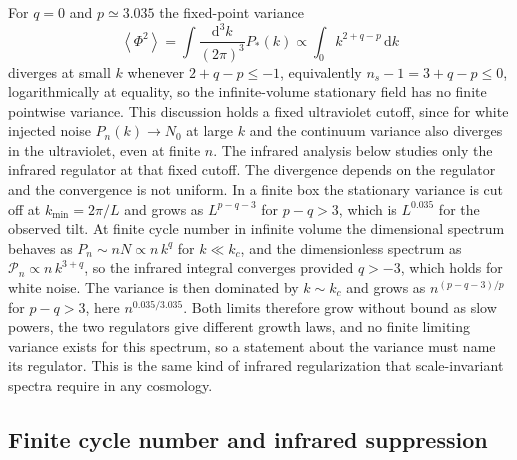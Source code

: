 \documentclass[11pt]{article}
\theoremstyle{definition}
\theoremstyle{remark}
\newcommand{\dd}{\mathrm{d}}
\newcommand{\avg}[1]{\left\langle #1 \right\rangle}
\newcommand{\Pk}{\mathcal{P}}
\begin{document}
For $q=0$ and $p\simeq3.035$ the fixed-point variance
\begin{equation}
\avg{\Phi^2}=\int\frac{\dd^3k}{(2\pi)^3}P_*(k)\propto\int_0k^{2+q-p}\,\dd k
\end{equation}
diverges at small $k$ whenever $2+q-p\le-1$, equivalently $n_s-1=3+q-p\le0$, logarithmically at equality, so the infinite-volume stationary field has no finite pointwise variance. This discussion holds a fixed ultraviolet cutoff, since for white injected noise $P_n(k)\to N_0$ at large $k$ and the continuum variance also diverges in the ultraviolet, even at finite $n$. The infrared analysis below studies only the infrared regulator at that fixed cutoff. The divergence depends on the regulator and the convergence is not uniform. In a finite box the stationary variance is cut off at $k_{\min}=2\pi/L$ and grows as $L^{p-q-3}$ for $p-q>3$, which is $L^{0.035}$ for the observed tilt. At finite cycle number in infinite volume the dimensional spectrum behaves as $P_n\sim nN\propto n\,k^q$ for $k\ll k_c$, and the dimensionless spectrum as $\Pk_n\propto n\,k^{3+q}$, so the infrared integral converges provided $q>-3$, which holds for white noise. The variance is then dominated by $k\sim k_c$ and grows as $n^{(p-q-3)/p}$ for $p-q>3$, here $n^{0.035/3.035}$. Both limits therefore grow without bound as slow powers, the two regulators give different growth laws, and no finite limiting variance exists for this spectrum, so a statement about the variance must name its regulator. This is the same kind of infrared regularization that scale-invariant spectra require in any cosmology.

\subsection{Finite cycle number and infrared suppression}
\end{document}
